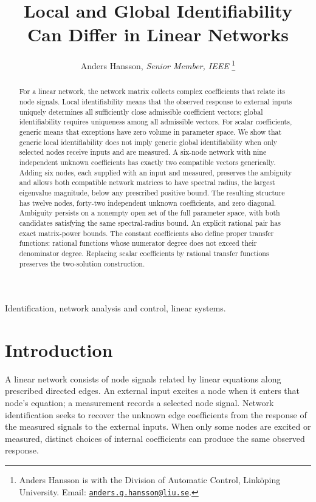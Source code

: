 \documentclass[letterpaper,10pt,conference]{ieeeconf}
\title{\LARGE\bf
Local and Global Identifiability Can Differ in Linear Networks}
\author{Anders Hansson, \textit{Senior Member, IEEE}%
\thanks{Anders Hansson is with the Division of Automatic Control,
Link\"oping University. Email:
\href{mailto:anders.g.hansson@liu.se}{\texttt{anders.g.hansson@liu.se}}.}}
\newcommand{\aicite}{\texorpdfstring{\protect\cite{codex}}{}}
\begin{document}
\maketitle
\thispagestyle{empty}
\pagestyle{empty}

\begin{abstract}
For a linear network, the network matrix collects complex coefficients that relate
its node signals. Local identifiability means that the observed response
to external inputs uniquely determines all sufficiently close admissible
coefficient vectors; global identifiability requires uniqueness among all
admissible vectors. For scalar coefficients, generic means that exceptions have zero volume in
parameter space. We show that generic local identifiability does not imply
generic global identifiability when only selected nodes receive inputs and
are measured. A six-node network with nine independent unknown coefficients
has exactly two compatible vectors generically. Adding six nodes, each
supplied with an input and measured, preserves the ambiguity and allows
both compatible network matrices to have spectral radius, the largest
eigenvalue magnitude, below any prescribed positive bound. The resulting
structure has twelve nodes, forty-two independent unknown coefficients,
and zero diagonal. Ambiguity persists on a nonempty open set of the full
parameter space, with both candidates satisfying the same spectral-radius
bound. An explicit rational pair has exact matrix-power bounds.
The constant coefficients also define proper transfer functions:
rational functions whose numerator degree does not exceed their
denominator degree.
Replacing scalar coefficients by rational transfer functions preserves
the two-solution construction.
\end{abstract}

\begin{keywords}
Identification, network analysis and control, linear systems.
\end{keywords}

\section{Introduction \aicite}\label{sec:intro}

A linear network consists of node signals related by linear equations
along prescribed directed edges. An external input excites a node when it
enters that node's equation; a measurement records a selected node signal.
Network identification seeks to recover the unknown edge coefficients from
the response of the measured signals to the external inputs. When only
some nodes are excited or measured, distinct choices of internal
coefficients can produce the same observed response.
\end{document}
